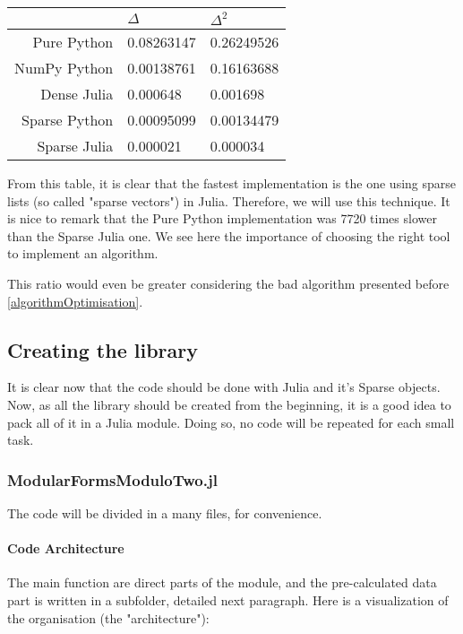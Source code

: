 \begin{center}
	\begin{tabular}{r||l|l}
		 & $\Delta$ & $\Delta^2$\\
		\hline\hline
		Pure Python   & 0.08263147 & 0.26249526 \\
		NumPy Python  & 0.00138761 & 0.16163688 \\
		Dense Julia   & 0.000648   & 0.001698   \\
		Sparse Python & 0.00095099 & 0.00134479 \\
		Sparse Julia  & 0.000021   & 0.000034   \\
	\end{tabular}
\end{center}

From this table, it is clear that the fastest implementation is the one using sparse lists (so called "sparse vectors") in Julia.
Therefore, we will use this technique.
It is nice to remark that the Pure Python implementation was 7720 times slower than the Sparse Julia one.
We see here the importance of choosing the right tool to implement an algorithm.

This ratio would even be greater considering the bad algorithm presented before \ref{algorithmOptimisation}.



\subsection{Creating the library}
It is clear now that the code should be done with Julia and it's Sparse objects.
Now, as all the library should be created from the beginning, it is a good idea to pack all of it in a Julia module.
Doing so, no code will be repeated for each small task.



\subsubsection[Main Module]{ModularFormsModuloTwo.jl}
The code will be divided in a many files, for convenience.

\paragraph{Code Architecture}
The main function are direct parts of the module, and the pre-calculated data part is written in a subfolder, detailed next paragraph.
Here is a visualization of the organisation (the "architecture"):

